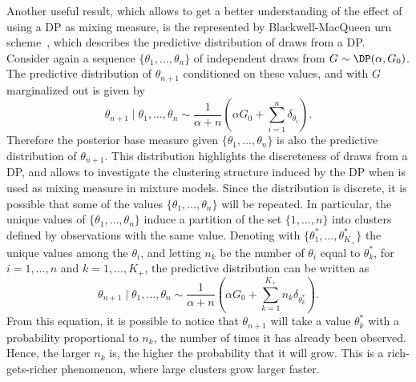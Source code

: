 Another useful result, which allows to get a better understanding of the effect of using a DP as mixing measure, is the represented by Blackwell-MacQueen urn scheme~\parencite{blackwell1973}, which describes the predictive distribution of draws from a DP. Consider again a sequence $\{\theta_1,\dots,\theta_n\}$ of independent draws from $G\sim\DP(\alpha,G_0)$. The predictive distribution of $\theta_{n+1}$ conditioned on these values, and with $G$ marginalized out is given by 
\begin{equation*}
\theta_{n+1} \mid \theta_1,\dots,\theta_n \sim \frac{1}{\alpha + n} \left( \alpha G_0 + \sum_{i=1}^n \delta_{\theta_i} \right).
\end{equation*}
Therefore the posterior base measure given $\{\theta_1,\dots,\theta_n\}$ is also the predictive distribution of $\theta_{n+1}$. This distribution highlights the discreteness of draws from a DP, and allows to investigate the clustering structure induced by the DP when is used as mixing measure in mixture models. Since the distribution is discrete, it is possible that some of the values $\{\theta_1,\dots,\theta_n\}$ will be repeated. In particular, the unique values of $\{\theta_1,\dots,\theta_n\}$ induce
a partition of the set $\{1,\dots,n\}$ into clusters defined by observations with the same value.
Denoting with $\{\theta^*_1, \dots, \theta^*_{K_+}\}$ the unique values among the $\theta_i$, and letting $n_k$ be the number of $\theta_i$ equal to $\theta^*_k$, for $i=1,\dots,n$ and $k=1,\dots,K_+$, the predictive distribution can be written as
\begin{equation*}
\theta_{n+1} \mid \theta_1,\dots,\theta_n \sim \frac{1}{\alpha + n} \left( \alpha G_0 + \sum_{k=1}^{K_+} n_k \delta_{\theta_k^*} \right).
\end{equation*}
From this equation, it is possible to notice that $\theta_{n+1}$ will take a value $\theta^*_k$ with a probability proportional to $n_k$, the number of times it has already been observed. 
Hence, the larger $n_k$ is, the higher the probability that it will grow. This is a rich-gets-richer phenomenon, where large clusters grow larger faster.

